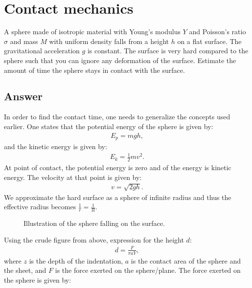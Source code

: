 \documentclass{article}
\begin{document}
\section*{Contact mechanics}
A sphere made of isotropic material with Young's modulus $Y$ and Poisson's ratio $\sigma$ and mass $M$ with uniform density falls from a height $h$ on a flat surface.
The gravitational acceleration $g$ is constant. The surface is very hard compared to the sphere such that you can ignore any deformation of the surface. Estimate the amount of time the sphere stays in contact with the surface.

\subsection*{Answer}
In order to find the contact time, one needs to generalize the concepts used earlier. One states that the potential energy of the sphere is given by:
\begin{align*}
    E_p = mgh,
\end{align*}and the kinetic energy is given by:
\begin{align*}
    E_k = \frac{1}{2}mv^2.
\end{align*}At point of contact, the potential energy is zero and of the energy is kinetic energy. The velocity at that point is given by:
\begin{align*}
    v = \sqrt{2gh}.
\end{align*}We approximate the hard surface as a sphere of infinite radius and thus the effective radius becomes $\frac{1}{r} = \frac{1}{R}$.
\begin{figure}[H]
    \centering
    \caption{Illustration of the sphere falling on the surface.}
    \label{fig: task4}
\end{figure}\noindent
Using the crude figure from above, expression for the height $d$:
\begin{align*}
    d = \frac{F}{\pi aY},
\end{align*}where $z$ is the depth of the indentation, $a$ is the contact area of the sphere and the sheet, and $F$ is the force exerted on the sphere/plane. The force exerted on the sphere is given by:
\end{document}
